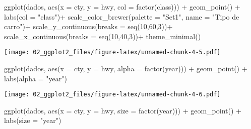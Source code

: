 \documentclass[
]{book}
\newenvironment{Shaded}{\begin{snugshade}}{\end{snugshade}}
\newcommand{\AttributeTok}[1]{\textcolor[rgb]{0.77,0.63,0.00}{#1}}
\newcommand{\DecValTok}[1]{\textcolor[rgb]{0.00,0.00,0.81}{#1}}
\newcommand{\FunctionTok}[1]{\textcolor[rgb]{0.00,0.00,0.00}{#1}}
\newcommand{\NormalTok}[1]{#1}
\newcommand{\SpecialCharTok}[1]{\textcolor[rgb]{0.00,0.00,0.00}{#1}}
\newcommand{\StringTok}[1]{\textcolor[rgb]{0.31,0.60,0.02}{#1}}
\begin{document}
\begin{Shaded}
\begin{Highlighting}[]
\FunctionTok{ggplot}\NormalTok{(dados, }\FunctionTok{aes}\NormalTok{(}\AttributeTok{x =}\NormalTok{ cty, }\AttributeTok{y =}\NormalTok{ hwy, }\AttributeTok{col =} \FunctionTok{factor}\NormalTok{(class))) }\SpecialCharTok{+} 
  \FunctionTok{geom\_point}\NormalTok{() }\SpecialCharTok{+} 
  \FunctionTok{labs}\NormalTok{(}\AttributeTok{col =} \StringTok{"class"}\NormalTok{)}\SpecialCharTok{+}
  \FunctionTok{scale\_color\_brewer}\NormalTok{(}\AttributeTok{palette =} \StringTok{"Set1"}\NormalTok{, }\AttributeTok{name =} \StringTok{"Tipo de carro"}\NormalTok{)}\SpecialCharTok{+}
  \FunctionTok{scale\_y\_continuous}\NormalTok{(}\AttributeTok{breaks =} \FunctionTok{seq}\NormalTok{(}\DecValTok{10}\NormalTok{,}\DecValTok{60}\NormalTok{,}\DecValTok{3}\NormalTok{))}\SpecialCharTok{+}
  \FunctionTok{scale\_x\_continuous}\NormalTok{(}\AttributeTok{breaks =} \FunctionTok{seq}\NormalTok{(}\DecValTok{10}\NormalTok{,}\DecValTok{40}\NormalTok{,}\DecValTok{3}\NormalTok{))}\SpecialCharTok{+}
  \FunctionTok{theme\_minimal}\NormalTok{()}
\end{Highlighting}
\end{Shaded}

\texttt{[image: 02\_ggplot2\_files/figure-latex/unnamed-chunk-4-5.pdf]}

\begin{Shaded}
\begin{Highlighting}[]
\FunctionTok{ggplot}\NormalTok{(dados, }\FunctionTok{aes}\NormalTok{(}\AttributeTok{x =}\NormalTok{ cty, }\AttributeTok{y =}\NormalTok{ hwy, }\AttributeTok{alpha =} \FunctionTok{factor}\NormalTok{(year))) }\SpecialCharTok{+} 
  \FunctionTok{geom\_point}\NormalTok{() }\SpecialCharTok{+} 
  \FunctionTok{labs}\NormalTok{(}\AttributeTok{alpha =} \StringTok{"year"}\NormalTok{)}
\end{Highlighting}
\end{Shaded}

\texttt{[image: 02\_ggplot2\_files/figure-latex/unnamed-chunk-4-6.pdf]}

\begin{Shaded}
\begin{Highlighting}[]
\FunctionTok{ggplot}\NormalTok{(dados, }\FunctionTok{aes}\NormalTok{(}\AttributeTok{x =}\NormalTok{ cty, }\AttributeTok{y =}\NormalTok{ hwy, }\AttributeTok{size =} \FunctionTok{factor}\NormalTok{(year))) }\SpecialCharTok{+} 
  \FunctionTok{geom\_point}\NormalTok{() }\SpecialCharTok{+} 
  \FunctionTok{labs}\NormalTok{(}\AttributeTok{size =} \StringTok{"year"}\NormalTok{)}
\end{Highlighting}
\end{Shaded}
\end{document}
